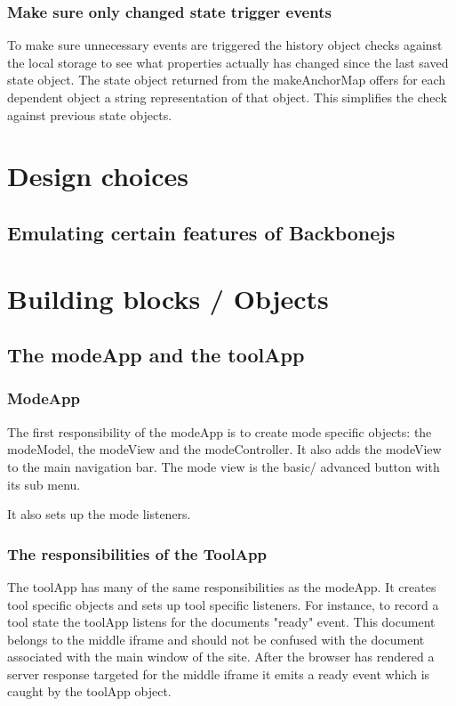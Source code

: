 \documentclass[english]{ifimaster}
\begin{document}
\subsubsection{Make sure only changed state trigger events}
To make sure unnecessary events are triggered the history object checks against the local storage to see what properties actually has changed since the last saved state object. The state object returned from the makeAnchorMap offers for each dependent object a string representation of that object. This simplifies the check against previous state objects.

\section{Design choices}
\subsection{Emulating certain features of Backbonejs}
\section{Building blocks / Objects}
\subsection{The modeApp and the toolApp}
\subsubsection{ModeApp}
The first responsibility of the modeApp is to create mode specific objects: the modeModel, the modeView and the modeController. It also adds the modeView to the main navigation bar. The mode view is the basic/ advanced button with its sub menu.

It also sets up the mode listeners. 

\subsubsection{The responsibilities of the ToolApp}
The toolApp has many of the same responsibilities as the modeApp. It creates tool specific objects and sets up tool specific listeners. For instance, to record a tool state the toolApp listens for the documents "ready" event. This document belongs to the middle iframe and should not be confused with the document associated with the main window of the site. After the browser has rendered a server response targeted for the middle iframe it emits a ready event which is caught by the toolApp object. 
\end{document}
